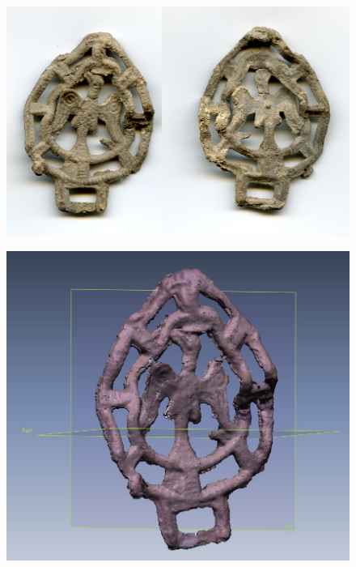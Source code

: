 \documentclass{beamer}
\begin{document}
		\begin{frame}
			\begin{multicols}{2}[][]
				\begin{figure}[]
					\begin{center}
						\includegraphics[width=1\linewidth]{snap3d/aquila1}
					\end{center}
					\label{fig:aquila1}
				\end{figure}
				\begin{figure}[]
					\begin{center}
						\includegraphics[width=1\linewidth]{snap3d/aquila2}
					\end{center}
					\label{fig:aquila2}
				\end{figure}
			\end{multicols}
		\end{frame}
\end{document}
